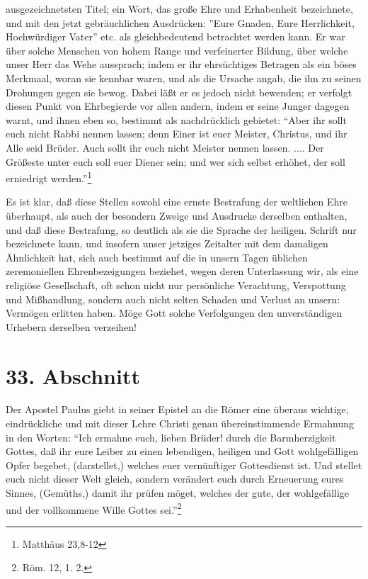 ausgezeichnetsten Titel; ein Wort, das große Ehre und Erhabenheit bezeichnete,
und mit den jetzt gebräuchlichen Ausdrücken: ''Eure Gnaden, Eure Herrlichkeit,
Hochwürdiger Vater'' etc. als gleichbedeutend betrachtet werden kann. Er war
über solche Menschen von hohem Range und verfeinerter Bildung, über welche unser
Herr das Wehe aussprach; indem er ihr ehrsüchtiges Betragen als ein böses
Merkmaal, woran sie kennbar waren, und als die Ursache angab, die ihn zu seinen
Drohungen gegen sie bewog. Dabei läßt er es jedoch nicht bewenden; er verfolgt
diesen Punkt von Ehrbegierde vor allen andern, indem er seine Junger dagegen
warnt, und ihnen eben so, bestimmt als nachdrücklich gebietet: "`Aber ihr sollt
euch nicht Rabbi nennen lassen; denn Einer ist euer Meister, Christus, und ihr
Alle seid Brüder. Auch sollt ihr euch nicht Meister nennen lassen. .... Der
Größeste unter euch soll euer Diener sein; und wer sich selbst erhöhet, der soll
erniedrigt werden."'\footnote{Matthäus 23,8-12}

\medskip

Es ist klar, daß diese Stellen sowohl eine ernste Bestrafung der weltlichen Ehre
überhaupt, als auch der besondern Zweige und Ausdrucke derselben enthalten, und
daß diese Bestrafung, so deutlich als sie die Sprache der heiligen. Schrift nur
bezeichnete kann, und insofern unser jetziges Zeitalter mit dem damaligen
Ähnlichkeit hat, sich auch bestimmt auf die in unsern Tagen üblichen
zeremoniellen Ehrenbezeigungen beziehet, wegen deren Unterlassung wir, als eine
religiöse Gesellschaft, oft schon nicht nur persönliche Verachtung, Verspottung
und Mißhandlung, sondern auch nicht selten Schaden und Verlust an unsern:
Vermögen erlitten haben. Möge Gott solche Verfolgungen den unverständigen
Urhebern derselben verzeihen!

\section{33. Abschnitt} \label{kap9_ab33}

Der Apostel Paulus giebt in seiner Epistel an die Römer eine überaus wichtige,
eindrückliche und mit dieser Lehre Christi genau übereinstimmende Ermahnung in
den Worten: "`Ich ermahne euch, lieben Brüder! durch die Barmherzigkeit Gottes,
daß ihr eure Leiber zu einen lebendigen, heiligen und Gott wohlgefälligen Opfer
begebet, (darstellet,) welches euer vernünftiger Gottesdienst ist. Und stellet
euch nicht dieser Welt gleich, sondern verändert euch durch Erneuerung eures
Sinnes, (Gemüths,) damit ihr prüfen möget, welches der gute, der wohlgefällige
und der vollkommene Wille Gottes sei."'\footnote{Röm. 12, 1. 2.}

